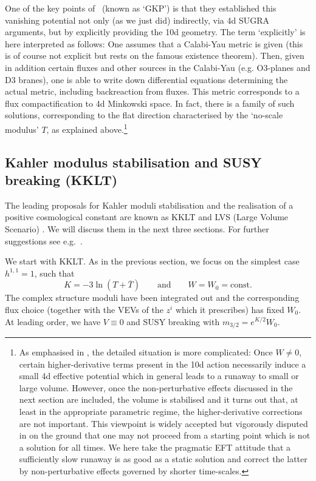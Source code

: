 \documentclass[12pt]{article}
\newcommand{\be}{\begin{equation}}
\newcommand{\ee}{\end{equation}}
\newcommand{\ol}{\overline}
\numberwithin{equation}{section}
\begin{document}
One of the key points of~\cite{Giddings:2001yu} (known as `GKP') is that they established this vanishing potential not only (as we just did) indirectly, via 4d SUGRA arguments, but by explicitly providing the 10d geometry. The term  `explicitly' is here interpreted as follows: One assumes that a Calabi-Yau metric is given (this is of course not explicit but rests on the famous existence theorem). Then, given in addition certain fluxes and other sources in the Calabi-Yau (e.g. O3-planes and D3 branes), one is able to write down differential equations determining the actual metric, including backreaction from fluxes. This metric corresponds to a flux compactification to 4d Minkowski space. In fact, there is a family of such solutions, corresponding to the flat direction characterised by the `no-scale modulus' $T$, as explained above.\footnote{
As emphasised in \cite{Sethi:2017phn}, the detailed situation is more complicated: Once $W\neq 0$, certain higher-derivative terms present in the 10d action necessarily induce a small 4d effective potential which in general leads to a runaway to small or large volume. However, once the non-perturbative effects discussed in the next section are included, the volume is stabilised and it turns out that, at least in the appropriate parametric regime, the higher-derivative corrections are not important. This viewpoint is widely accepted but vigorously disputed in \cite{Sethi:2017phn} on the ground that one may not proceed from a starting point which is not a solution for all times. We here take the pragmatic EFT attitude that a sufficiently slow runaway is as good as a static solution and correct the latter by non-perturbative effects governed by shorter time-scales.
}








\subsection{Kahler modulus stabilisation and SUSY breaking (KKLT)}
\label{kklt1}
The leading proposals for Kahler moduli stabilisation and the realisation of a positive cosmological constant are known as KKLT \cite{Kachru:2003aw} and LVS (Large Volume Scenario) \cite{Balasubramanian:2005zx}. We will discuss them in the next three sections. For further suggestions see e.g.~\cite{Westphal:2006tn, Balasubramanian:2004uy}.

We start with KKLT. As in the previous section, we focus on the simplest case $h^{1,1}=1$, such that
\be
K=-3\ln(T+\ol{T})\qquad\mbox{and}\qquad W=W_0=\mbox{const.}
\ee
The complex structure moduli have been integrated out and the corresponding flux choice (together with the VEVs of the $z^i$ which it prescribes) has fixed $W_0$.  At leading order, we have $V\equiv 0$ and SUSY breaking with $m_{3/2} = e^{K/2}W_0$.
\end{document}
